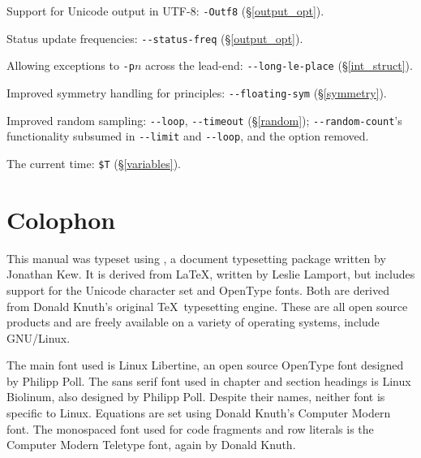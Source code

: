 \documentclass[a4paper,11pt,oneside]{book}
\newcommand{\sref}[1]{\hyperref[#1]{\S\ref{#1}}}
\begin{document}
\begin{list}{}{\leftmargin=1em\itemsep=0em}
\item Support for Unicode output in UTF-8: \verb+-Outf8+ (\sref{output_opt}).
\item Status update frequencies: \verb+--status-freq+ (\sref{output_opt}).
\item Allowing exceptions to \verb+-p+$n$ across the lead-end: 
  \verb+--long-le-place+ (\sref{int_struct}).
\item Improved symmetry handling for principles: 
  \verb+--floating-sym+ (\sref{symmetry}).
\item Improved random sampling: \verb+--loop+, \verb+--timeout+ 
  (\sref{random}); \verb+--random-count+'s functionality subsumed in
  \verb+--limit+ and \verb+--loop+, and the option removed.
\item The current time: \verb+$T+ (\sref{variables}).
\end{list}

\clearpage
{}
\footnotesize
{}

\normalsize
\chapter*{Colophon}

This manual was typeset using \XeTeX{}, a document 
typesetting package written by Jonathan Kew.  It is derived from 
\LaTeX, written by Leslie Lamport, but includes support for the Unicode 
character set and OpenType fonts.
Both are derived from Donald Knuth's original \TeX\ typesetting engine.  
These are all open source products and are freely available on a variety of 
operating systems, include GNU/Linux. 

The main font used is Linux Libertine, an open source OpenType font designed
by Philipp Poll.  The sans serif font used in chapter and section headings
is Linux Biolinum, also designed by Philipp Poll.  Despite their names,
neither font is specific to Linux.  Equations are set using Donald Knuth's 
Computer Modern font.  The monospaced font used for code fragments and
row literals is the Computer Modern Teletype font, again by Donald Knuth.%
\end{document}
